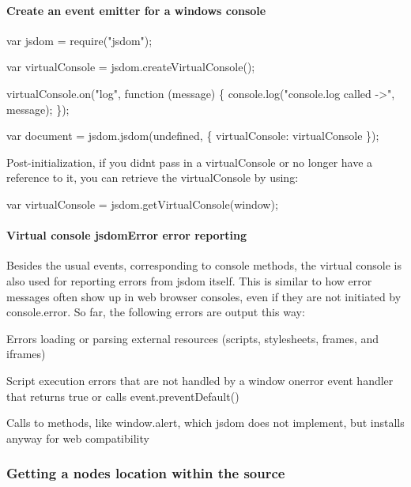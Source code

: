 \paragraph*{Create an event emitter for a window\textquotesingle{}s console}


\begin{DoxyCode}
var jsdom = require("jsdom");

var virtualConsole = jsdom.createVirtualConsole();

virtualConsole.on("log", function (message) \{
  console.log("console.log called ->", message);
\});

var document = jsdom.jsdom(undefined, \{
  virtualConsole: virtualConsole
\});
\end{DoxyCode}


Post-\/initialization, if you didn\textquotesingle{}t pass in a {\ttfamily virtual\+Console} or no longer have a reference to it, you can retrieve the {\ttfamily virtual\+Console} by using\+:


\begin{DoxyCode}
var virtualConsole = jsdom.getVirtualConsole(window);
\end{DoxyCode}


\paragraph*{Virtual console {\ttfamily jsdom\+Error} error reporting}

Besides the usual events, corresponding to {\ttfamily console} methods, the virtual console is also used for reporting errors from jsdom itself. This is similar to how error messages often show up in web browser consoles, even if they are not initiated by {\ttfamily console.\+error}. So far, the following errors are output this way\+:


\begin{DoxyItemize}
\item Errors loading or parsing external resources (scripts, stylesheets, frames, and iframes)
\item Script execution errors that are not handled by a window {\ttfamily onerror} event handler that returns {\ttfamily true} or calls {\ttfamily event.\+prevent\+Default()}
\item Calls to methods, like {\ttfamily window.\+alert}, which jsdom does not implement, but installs anyway for web compatibility
\end{DoxyItemize}

\subsubsection*{Getting a node\textquotesingle{}s location within the source}


